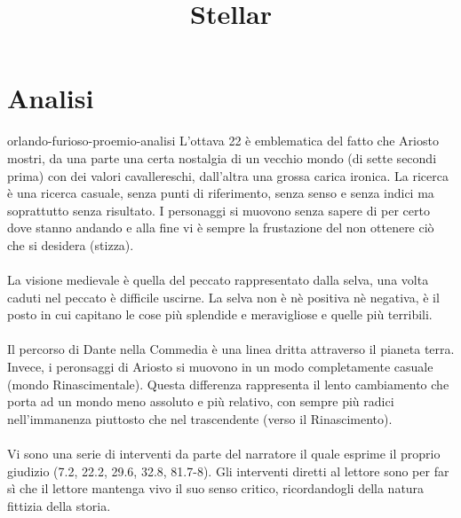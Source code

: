 \documentclass[preview]{standalone}
\begin{document}
\title{Stellar}
\genpage

\section{Analisi}

\begin{snippet}{orlando-furioso-proemio-analisi}
    L'ottava 22 è emblematica del fatto che Ariosto mostri, da una parte una
    certa nostalgia di un vecchio mondo (di sette secondi prima) con dei valori cavallereschi,
    dall'altra una grossa carica ironica.
    La ricerca è una ricerca casuale, senza punti di riferimento, senza senso e senza indici
    ma soprattutto senza risultato.
    I personaggi si muovono senza sapere di per certo dove stanno andando
    e alla fine vi è sempre la frustazione del non ottenere ciò che si desidera (stizza).
    \\\\
    La visione medievale è quella del peccato rappresentato dalla selva, una volta caduti
    nel peccato è difficile uscirne. La selva non è nè positiva nè negativa, è il posto
    in cui capitano le cose più splendide e meravigliose e quelle più terribili.
    \\\\
    Il percorso di Dante nella Commedia è una linea dritta attraverso il pianeta terra.
    Invece, i peronsaggi di Ariosto si muovono in un modo completamente casuale (mondo Rinascimentale).
    Questa differenza rappresenta il lento cambiamento che porta ad un mondo meno assoluto e più relativo,
    con sempre più radici nell'immanenza piuttosto che nel trascendente (verso il Rinascimento).
    \\\\
    Vi sono una serie di interventi da parte del narratore il quale
    esprime il proprio giudizio (7.2, 22.2, 29.6, 32.8, 81.7-8).
    Gli interventi diretti al lettore sono per far sì che il lettore mantenga vivo il suo senso critico, ricordandogli
    della natura fittizia della storia.
\end{snippet}
\end{document}
